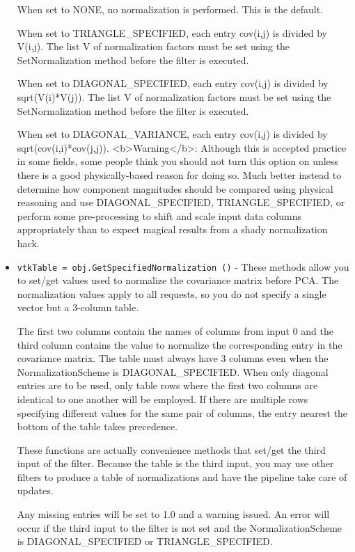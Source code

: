 \begin{itemize}
 When set to NONE, no normalization is performed. This is the default.

 When set to TRIANGLE\_SPECIFIED, each entry cov(i,j) is divided by V(i,j).
 The list V of normalization factors must be set using the SetNormalization method
 before the filter is executed.

 When set to DIAGONAL\_SPECIFIED, each entry cov(i,j) is divided by sqrt(V(i)*V(j)).
 The list V of normalization factors must be set using the SetNormalization method
 before the filter is executed.

 When set to DIAGONAL\_VARIANCE, each entry cov(i,j) is divided by sqrt(cov(i,i)*cov(j,j)).
 <b>Warning</b>: Although this is accepted practice in some fields,
 some people think you should not turn this option on unless there
 is a good physically-based reason for doing so. Much better instead
 to determine how component magnitudes should be compared using
 physical reasoning and use DIAGONAL\_SPECIFIED, TRIANGLE\_SPECIFIED, or
 perform some pre-processing to shift and scale input data columns
 appropriately than to expect magical results from a shady normalization hack.

\item  \verb|vtkTable = obj.GetSpecifiedNormalization ()| -  These methods allow you to set/get values used to normalize the covariance matrix before PCA.
 The normalization values apply to all requests, so you do not specify a single
 vector but a 3-column table.

 The first two columns contain the names of columns from input 0 and the third column contains
 the value to normalize the corresponding entry in the covariance matrix.
 The table must always have 3 columns even when the NormalizationScheme is DIAGONAL\_SPECIFIED.
 When only diagonal entries are to be used, only table rows where the first two columns are
 identical to one another will be employed.
 If there are multiple rows specifying different values for the same pair of columns,
 the entry nearest the bottom of the table takes precedence.

 These functions are actually convenience methods that set/get the third input of the filter.
 Because the table is the third input, you may use other filters to produce a table of
 normalizations and have the pipeline take care of updates.

 Any missing entries will be set to 1.0 and a warning issued.
 An error will occur if the third input to the filter is not set and the
 NormalizationScheme is DIAGONAL\_SPECIFIED or TRIANGLE\_SPECIFIED.


\end{itemize}
